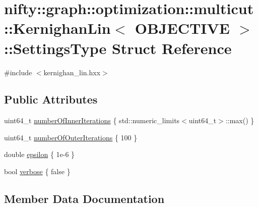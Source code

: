 \hypertarget{structnifty_1_1graph_1_1optimization_1_1multicut_1_1KernighanLin_1_1SettingsType}{}\section{nifty\+:\+:graph\+:\+:optimization\+:\+:multicut\+:\+:Kernighan\+Lin$<$ O\+B\+J\+E\+C\+T\+I\+V\+E $>$\+:\+:Settings\+Type Struct Reference}
\label{structnifty_1_1graph_1_1optimization_1_1multicut_1_1KernighanLin_1_1SettingsType}


{\ttfamily \#include $<$kernighan\+\_\+lin.\+hxx$>$}

\subsection*{Public Attributes}
\begin{DoxyCompactItemize}
\item 
uint64\+\_\+t \hyperlink{structnifty_1_1graph_1_1optimization_1_1multicut_1_1KernighanLin_1_1SettingsType_a349391850df000ee5daca1d09f9f1699}{number\+Of\+Inner\+Iterations} \{ std\+::numeric\+\_\+limits$<$uint64\+\_\+t$>$\+::max() \}
\item 
uint64\+\_\+t \hyperlink{structnifty_1_1graph_1_1optimization_1_1multicut_1_1KernighanLin_1_1SettingsType_af157041373b51ec37a22c0f40e650dbf}{number\+Of\+Outer\+Iterations} \{ 100 \}
\item 
double \hyperlink{structnifty_1_1graph_1_1optimization_1_1multicut_1_1KernighanLin_1_1SettingsType_ab864b1afef3a450cbb003fc6f4a50aab}{epsilon} \{ 1e-\/6 \}
\item 
bool \hyperlink{structnifty_1_1graph_1_1optimization_1_1multicut_1_1KernighanLin_1_1SettingsType_ade43b63e346f7e5bf84bc2a4e26fdc5a}{verbose} \{ false \}
\end{DoxyCompactItemize}


\subsection{Member Data Documentation}
\hypertarget{structnifty_1_1graph_1_1optimization_1_1multicut_1_1KernighanLin_1_1SettingsType_ab864b1afef3a450cbb003fc6f4a50aab}{}
